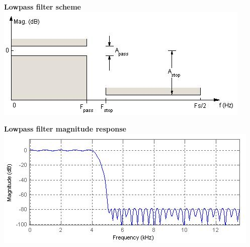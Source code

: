 \documentclass[a4paper,11pt]{article}
\begin{document}
\begin{minipage}[h]{0.47\linewidth}	
\begin{center} 
\textbf{Lowpass filter scheme}\\
			\includegraphics[width=\linewidth]{./images/nonorth_alford/lowpass_filter_scheme}
			
\end{center}
\end{minipage} \hfill
\begin{minipage}[h]{0.47\linewidth}
\begin{center}
\textbf{Lowpass filter magnitude response}
			\includegraphics[width=\linewidth]{./images/nonorth_alford/lowpass_margn_response}\\
	  		
\end{center}	  		
\end{minipage}
\end{document}
